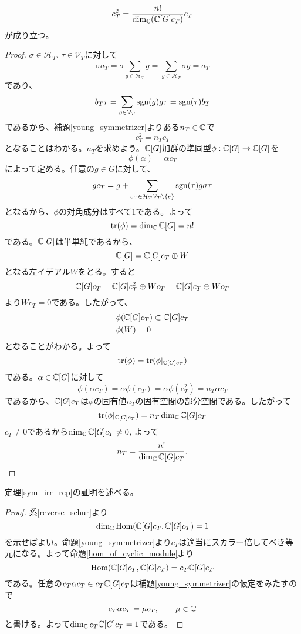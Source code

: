 \documentclass{ltjsreport}
\begin{document}
\begin{prop}\label{square_of_young_sym}
  \[
  c_T^2=\frac{n!}{\dim_{\mathbb{C}}(\mathbb{C}[G]c_T)}c_T  
  \]
  が成り立つ。
\end{prop}

\begin{proof}
  $\sigma\in\mathcal{H}_T$, $\tau\in\mathcal{V}_T$に対して
  \[
  \sigma a_T=\sigma\sum_{g\in\mathcal{H}_T}g=\sum_{g\in\mathcal{H}_T}\sigma g=a_T  
  \]
  であり、
  \[
  b_T\tau=\sum_{g\in\mathcal{V}_T}\mathrm{sgn}(g)g\tau=\mathrm{sgn}(\tau)b_T  
  \]
  であるから、補題\ref{young_symmetrizer}よりある$n_T\in\mathbb{C}$で
  \[
  c_T^2=n_T c_T  
  \]
  となることはわかる。$n_T$を求めよう。$\mathbb{C}[G]$加群の準同型$\phi:\mathbb{C}[G]\rightarrow\mathbb{C}[G]$を
  \[
  \phi(\alpha)=\alpha c_T  
  \]
  によって定める。任意の$g\in G$に対して、
  \[
  gc_T=g+\sum_{\sigma\tau\in\mathcal{H}_T\mathcal{V}_T\setminus\{e\}}\mathrm{sgn}(\tau)g\sigma\tau  
  \]
  となるから、$\phi$の対角成分はすべて$1$である。よって
  \[
  \text{tr}(\phi)=\dim_{\mathbb{C}}\mathbb{C}[G]=n!  
  \]
  である。$\mathbb{C}[G]$は半単純であるから、
  \[
  \mathbb{C}[G]=\mathbb{C}[G]c_T\oplus W  
  \]
  となる左イデアル$W$をとる。すると
  \[
  \mathbb{C}[G]c_T=\mathbb{C}[G]c_T^2\oplus Wc_T=\mathbb{C}[G]c_T\oplus Wc_T 
  \]
  より$Wc_T=0$である。したがって、
  \begin{align*}
    &\phi(\mathbb{C}[G]c_T)\subset \mathbb{C}[G]c_T\\
    &\phi(W)=0
  \end{align*}
  となることがわかる。よって
  \[
  \text{tr}(\phi)=\text{tr}(\phi|_{\mathbb{C}[G]c_T})  
  \]
  である。$\alpha\in\mathbb{C}[G]$に対して
  \[
  \phi(\alpha c_T)=\alpha\phi(c_T)=\alpha\phi(c_T^2)=n_T\alpha c_T
  \]
  であるから、$\mathbb{C}[G]c_T$は$\phi$の固有値$n_T$の固有空間の部分空間である。したがって
  \[
  \text{tr}(\phi|_{\mathbb{C}[G]c_T})=n_T\dim_{\mathbb{C}}\mathbb{C}[G]c_T 
  \]
  $c_T\neq 0$であるから$\dim_{\mathbb{C}}\mathbb{C}[G]c_T\neq 0$,
  よって
  \[
  n_T=\frac{n!}{\dim_{\mathbb{C}}\mathbb{C}[G]c_T}.
  \]
\end{proof}

定理\ref{sym_irr_rep}の証明を述べる。

\begin{proof}
  系\ref{reverse_schur}より
  \[
  \dim_{\mathbb{C}}\text{Hom}(\mathbb{C}[G]c_T,\mathbb{C}[G]c_T)=1  
  \]
  を示せばよい。命題\ref{young_symmetrizer}より$c_T$は適当にスカラー倍してべき等元になる。よって命題\ref{hom_of_cyclic_module}より
  \[
  \text{Hom}(\mathbb{C}[G]c_T,\mathbb{C}[G]c_T)=c_T\mathbb{C}[G]c_T  
  \]
  である。任意の$c_T\alpha c_T\in c_T\mathbb{C}[G]c_T$は補題\ref{young_symmetrizer}の仮定をみたすので
  \[
    c_T\alpha c_T=\mu c_T,\qquad\mu\in\mathbb{C}
  \]
  と書ける。よって$\dim_{\mathbb{C}} c_T\mathbb{C}[G]c_T=1$である。
\end{proof}
\end{document}
